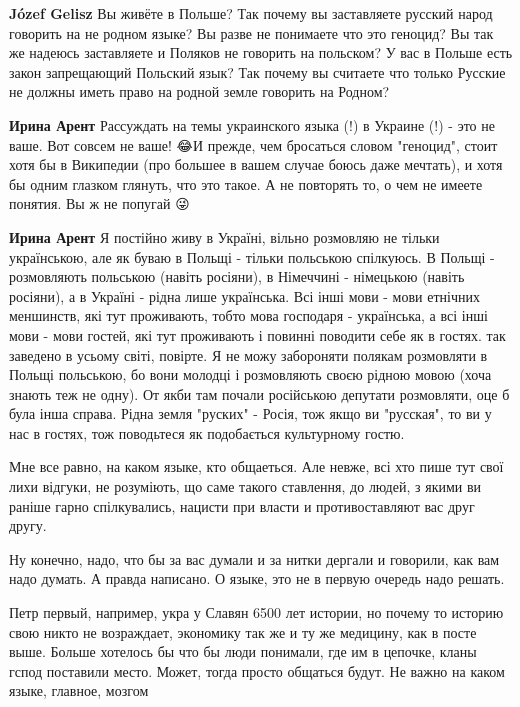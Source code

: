 \begin{itemize}
\begin{itemize}
\textbf{Józef Gelisz} Вы живёте в Польше? Так почему вы заставляете русский
народ говорить на не родном языке? Вы разве не понимаете что это геноцид? Вы
так же надеюсь заставляете и Поляков не говорить на польском? У вас в Польше
есть закон запрещающий Польский язык? Так почему вы считаете что только Русские
не должны иметь право на родной земле говорить на Родном?


\textbf{Ирина Арент} Рассуждать на темы украинского языка (!) в Украине (!) -
это не ваше. Вот совсем не ваше! 😂И прежде, чем бросаться словом "геноцид",
стоит хотя бы в Википедии (про большее в вашем случае боюсь даже мечтать), и
хотя бы одним глазком глянуть, что это такое. А не повторять то, о чем не
имеете понятия. Вы ж не попугай 😜


\textbf{Ирина Арент} Я постійно живу в Україні, вільно розмовляю не тільки
українською, але як буваю в Польщі - тільки польською спілкуюсь. В Польщі -
розмовляють польською (навіть росіяни), в Німеччині - німецькою (навіть
росіяни), а в Україні - рідна лише українська. Всі інші мови - мови етнічних
меншинств, які тут проживають, тобто мова господаря - українська, а всі інші
мови - мови гостей, які тут проживають і повинні поводити себе як в гостях. так
заведено в усьому світі, повірте. Я не можу забороняти полякам розмовляти в
Польщі польською, бо вони молодці і розмовляють своєю рідною мовою (хоча знають
теж не одну). От якби там почали російською депутати розмовляти, оце б була
інша справа. Рідна земля "руских" - Росія, тож якщо ви "русская", то ви у нас в
гостях, тож поводьтеся як подобається культурному гостю.
\end{itemize}



Мне все равно, на каком языке, кто общаеться. Але невже, всі хто пише тут свої
лихи відгуки, не розуміють, що саме такого ставлення, до людей, з якими ви
раніше гарно спілкувались, нацисти при власти и противоставляют вас друг другу.

Ну конечно, надо, что бы за вас думали и за нитки дергали и говорили, как вам
надо думать. А правда написано. О языке, это не в первую очередь надо решать.

Петр первый, например, укра у Славян 6500 лет истории, но почему то историю
свою никто не возраждает, экономику так же и ту же медицину, как в посте выше.
Больше хотелось бы что бы люди понимали, где им в цепочке, кланы гспод
поставили место. Может, тогда просто общаться будут. Не важно на каком языке,
главное, мозгом


\end{itemize}
